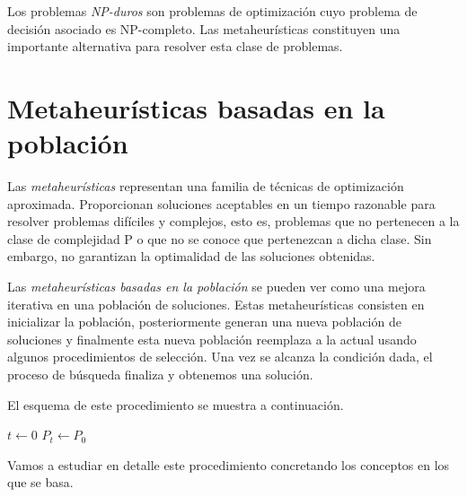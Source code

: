 Los problemas \emph{NP-duros} son problemas de optimización cuyo problema de decisión asociado es NP-completo. Las metaheurísticas constituyen una importante alternativa para resolver esta clase de problemas.

\section{Metaheurísticas basadas en la población}

Las \emph{metaheurísticas} representan una familia de técnicas de optimización aproximada. Proporcionan soluciones aceptables en un tiempo razonable para resolver problemas difíciles y complejos, esto es, problemas que no pertenecen a la clase de complejidad P o que no se conoce que pertenezcan a dicha clase. Sin embargo, no garantizan la optimalidad de las soluciones obtenidas.

Las \emph{metaheurísticas basadas en la población} se pueden ver como una mejora iterativa en una población de soluciones. Estas metaheurísticas consisten en inicializar la población, posteriormente generan una nueva población de soluciones y finalmente esta nueva población reemplaza a la actual usando algunos procedimientos de selección. Una vez se alcanza la condición dada, el proceso de búsqueda finaliza y obtenemos una solución.

El esquema de este procedimiento se muestra a continuación.

\begin{Ualgorithm}[H]
    \small
    \DontPrintSemicolon
    $t \longleftarrow 0$\;
    $P_t \longleftarrow P_0$ 
    
\end{Ualgorithm}

Vamos a estudiar en detalle este procedimiento concretando los conceptos en los que se basa.

